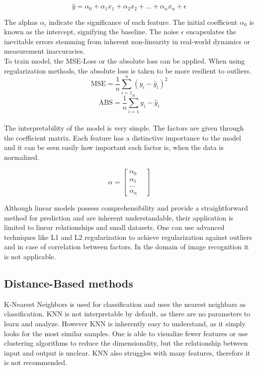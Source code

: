 $$ \hat{y}= \alpha_0 + \alpha_1 x_1 + \alpha_2 x_2 +... +\alpha_n x_{n} + \epsilon$$

The alphas $\alpha_i$ indicate the significance of each feature. The initial coefficient $\alpha_0$ is known as the intercept, signifying the baseline.  The noise $\epsilon$ encapsulates the inevitable errors stemming from inherent non-linearity in real-world dynamics or measurement inaccuracies.
\\
To train model, the MSE-Loss or the absolute loss can be applied. When using regularization methods, the absolute loss is taken to be more resilient to outliers.
$$ \text{MSE} = \frac{1}{n} \sum_{i=1}^{n} (y_i - \hat{y}_i)^2$$
$$ \text{ABS} = \frac{1}{n} \sum_{i=1}^{n} y_i - \hat{y}_i$$
\\
The interpretability of the model is very simple. The factors are given through the coefficient matrix. Each feature has a distinctive importance to the model and it can be seen easily how important each factor is, when the data is normalized. 

$$ \alpha = \begin{bmatrix}
	\alpha_0 & \\
	\alpha_1 & \\
	... & \\
	\alpha_n &
\end{bmatrix}
$$


Although linear models possess comprehensibility and provide a straightforward method for prediction and are inherent understandable, their application is limited to linear relationships and small datasets. One can use advanced techniques like L1 and L2 regularization \cite{jerome2010} to achieve regularization against outliers and in case of correlation between factors. In the domain of image recognition it is not applicable.

\subsection{Distance-Based methods}

K-Nearest Neighbors is used for classification and uses the nearest neighbars as classification. KNN is not interpretable by default, as there are no parameters to learn and analyze. However KNN is inherently easy to understand, as it simply looks for the most similar samples. One is able to visualize fewer features or use clustering algorithms to reduce the dimensionality, but the relationship between input and output is unclear. KNN also struggles with many features, therefore it is not recommended.

